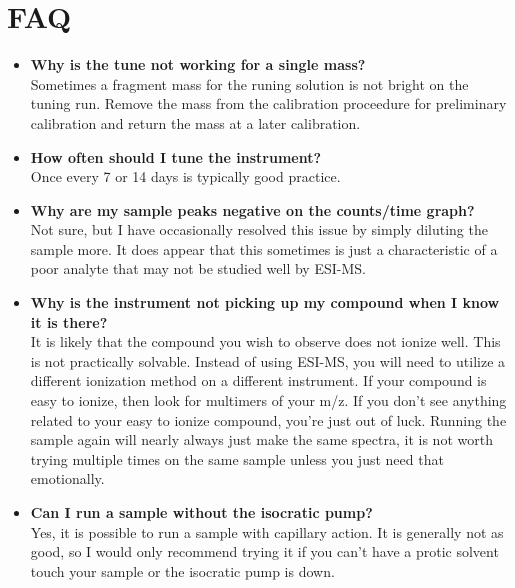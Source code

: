 \documentclass[12pt, letterpaper]{article}
\begin{document}
\section{FAQ}
\begin{itemize}

	\item \textbf{Why is the tune not working for a single mass?}\\
		Sometimes a fragment mass for the runing solution is not bright on the tuning run.
		Remove the mass from the calibration proceedure for preliminary calibration and return the mass at a later calibration.

	\item \textbf{How often should I tune the instrument?}\\
		Once every 7 or 14 days is typically good practice.
		
	\item \textbf{Why are my sample peaks negative on the counts/time graph?}\\
		Not sure, but I have occasionally resolved this issue by simply diluting the sample more.
		It does appear that this sometimes is just a characteristic of a poor analyte that may not be studied well by ESI-MS.
		
	\item \textbf{Why is the instrument not picking up my compound when I know it is there?}\\
		It is likely that the compound you wish to observe does not ionize well.
		This is not practically solvable.
		Instead of using ESI-MS, you will need to utilize a different ionization method on a different instrument.
		If your compound is easy to ionize, then look for multimers of your m/z.
		If you don't see anything related to your easy to ionize compound, you're just out of luck.
		Running the sample again will nearly always just make the same spectra, it is not worth trying multiple times on the same sample unless you just need that emotionally.
		
	\item \textbf{Can I run a sample without the isocratic pump?}\\
		Yes, it is possible to run a sample with capillary action.
		It is generally not as good, so I would only recommend trying it if you can't have a protic solvent touch your sample or the isocratic pump is down.

\end{itemize}
\end{document}
